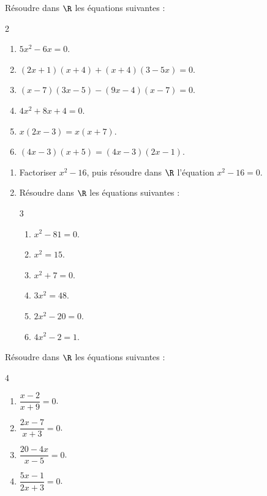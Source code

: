 \exo

Résoudre dans $\R$ les équations suivantes :

\vspace{-6pt}
\setlength{\columnsep}{1cm}
\setlength{\columnseprule}{0pt}
\begin{multicols}{2}
\begin{enumerate}
\item $5x^2-6x=0$.
\smallskip
\item $(2x+1)(x+4)+(x+4)(3-5x)=0$.
\smallskip
\item $(x-7)(3x-5)-(9x-4)(x-7)=0$.

\item $4x^2+8x+4=0$.
\smallskip
\item $x(2x-3)=x(x+7)$.
\smallskip
\item $(4x-3)(x+5)=(4x-3)(2x-1)$.
\end{enumerate}
\end{multicols}
\vspace{-12pt}

\exo

\begin{enumerate}
\item Factoriser $x^2-16$, puis résoudre dans $\R$ l'équation $x^2-16=0$.
\item Résoudre dans $\R$ les équations suivantes :
\vspace{-6pt}
\setlength{\columnsep}{1cm}
\setlength{\columnseprule}{0pt}
\begin{multicols}{3}
\begin{enumerate}
\item $x^2-81=0$.
\smallskip
\item $x^2=15$.

\item $x^2+7=0$.
\smallskip
\item $3x^2=48$.

\item $2x^2-20=0$.
\smallskip
\item $4x^2-2=1$.
\end{enumerate}
\end{multicols}
\vspace{-12pt}
\end{enumerate}

\exo

Résoudre dans $\R$ les équations suivantes :

\vspace{-6pt}
\setlength{\columnsep}{1cm}
\setlength{\columnseprule}{0pt}
\begin{multicols}{4}
\begin{enumerate}
\item $\dfrac{x-2}{x+9}=0$.

\item $\dfrac{2x-7}{x+3}=0$.

\item $\dfrac{20-4x}{x-5}=0$.

\item $\dfrac{5x-1}{2x+3}=0$.
\end{enumerate}
\end{multicols}
\vspace{-12pt}

